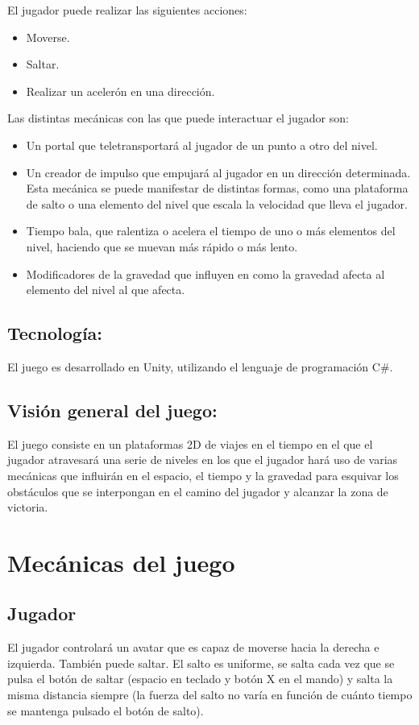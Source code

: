 El jugador puede realizar las siguientes acciones:
\begin{itemize}
\item
Moverse.
\item
Saltar.
\item
Realizar un acelerón en una dirección.
\end{itemize}
Las distintas mecánicas con las que puede interactuar el jugador son:
\begin{itemize}
\item
Un portal que teletransportará al jugador de un punto a otro del nivel.
\item
Un creador de impulso que empujará al jugador en un dirección determinada. Esta mecánica se puede manifestar de distintas formas, como una plataforma de salto o una elemento del nivel que escala la velocidad que lleva el jugador.
\item
Tiempo bala, que ralentiza o acelera el tiempo de uno o más elementos del nivel, haciendo que se muevan más rápido o más lento.
\item
Modificadores de la gravedad que influyen en como la gravedad afecta al elemento del nivel al que afecta.
\end{itemize}

\subsection{Tecnología:}
El juego es desarrollado en Unity, utilizando el lenguaje de programación C\#.

\subsection{Visión general del juego:}
El juego consiste en un plataformas 2D de viajes en el tiempo en el que el jugador atravesará una serie de niveles en los que el jugador hará uso de varias mecánicas que influirán en el espacio, el tiempo y la gravedad para esquivar los obstáculos que se interpongan en el camino del jugador y alcanzar la zona de victoria. 

\section{Mecánicas del juego}
\subsection{Jugador}
El jugador controlará un avatar que es capaz de moverse hacia la derecha e izquierda. También puede saltar. El salto es uniforme, se salta cada vez que se pulsa el botón de saltar (espacio en teclado y botón X en el mando) y salta la misma distancia siempre (la fuerza del salto no varía en función de cuánto tiempo se mantenga pulsado el botón de salto). 

